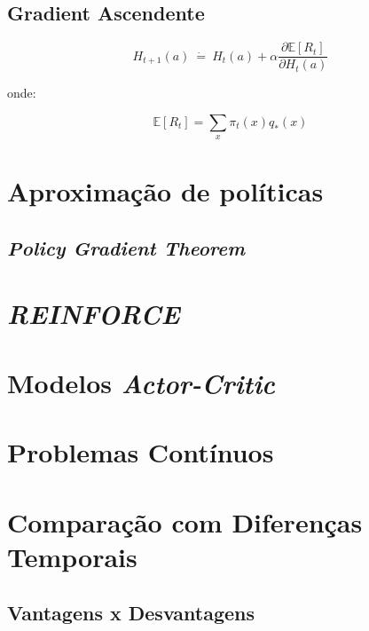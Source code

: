 \documentclass{article}
\begin{document}
        \subsection{Gradient Ascendente}
        
            \begin{equation}
                H_{t+1}(a) \ \dot{=} \ H_t(a) + \alpha \frac{\partial \mathbb{E}[R_t]}{\partial H_t(a)}
            \end{equation}
            
            onde:
            
            \begin{equation}
                \mathbb{E}[R_t] = \sum_x \pi_t(x) q_*(x)
            \end{equation}
        
    \section{Aproximação de políticas}
    
        \subsection{\emph{Policy Gradient Theorem}}
        
    \section{\emph{REINFORCE}}
    
    \section{Modelos \emph{Actor-Critic}}
    
    \section{Problemas Contínuos}
    
    \section{Comparação com Diferenças Temporais}
    
        \subsection{Vantagens x Desvantagens}
    
    
\end{document}
